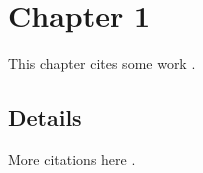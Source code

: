 
\section{Chapter 1}

This chapter cites some work \cite{kitchin-2015-examp,smith2020}.

\subsection{Details}

More citations here \cite{jones2019}.

